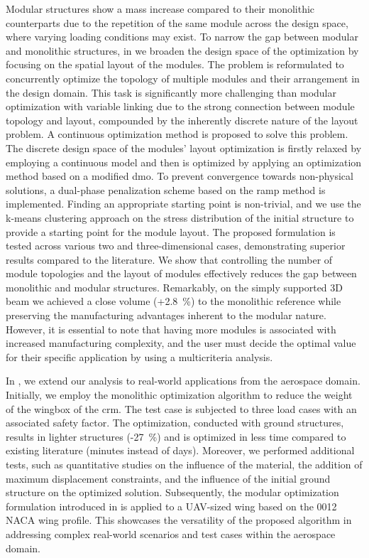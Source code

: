 Modular structures show a mass increase compared to their monolithic counterparts due to the repetition of the same module across the design space, where varying loading conditions may exist. To narrow the gap between modular and monolithic structures, in  we broaden the design space of the optimization by focusing on the spatial layout of the modules. The problem is reformulated to concurrently optimize the topology of multiple modules and their arrangement in the design domain. This task is significantly more challenging than modular optimization with variable linking due to the strong connection between module topology and layout, compounded by the inherently discrete nature of the layout problem. A continuous optimization method is proposed to solve this problem. The discrete design space of the modules' layout optimization is firstly relaxed by employing a continuous model and then is optimized by applying an optimization method based on a modified \gls{dmo}. To prevent convergence towards non-physical solutions, a dual-phase penalization scheme based on the \gls{ramp} method is implemented. Finding an appropriate starting point is non-trivial, and we use the k-means clustering approach on the stress distribution of the initial structure to provide a starting point for the module layout. The proposed formulation is tested across various two and three-dimensional cases, demonstrating superior results compared to the literature. We show that controlling the number of module topologies and the layout of modules effectively reduces the gap between monolithic and modular structures. Remarkably, on the simply supported 3D beam we achieved a close volume (+\qty{2.8}{\percent}) to the monolithic reference while preserving the manufacturing advantages inherent to the modular nature. However, it is essential to note that having more modules is associated with increased manufacturing complexity, and the user must decide the optimal value for their specific application by using a multicriteria analysis.

In , we extend our analysis to real-world applications from the aerospace domain. Initially, we employ the monolithic optimization algorithm to reduce the weight of the wingbox of the \gls{crm}. The test case is subjected to three load cases with an associated safety factor. The optimization, conducted with ground structures, results in lighter structures (-\qty{27}{\%}) and is optimized in less time compared to existing literature (minutes instead of days). Moreover, we performed additional tests, such as quantitative studies on the influence of the material, the addition of maximum displacement constraints, and the influence of the initial ground structure on the optimized solution. Subsequently, the modular optimization formulation introduced in  is applied to a UAV-sized wing based on the 0012 NACA wing profile. This showcases the versatility of the proposed algorithm in addressing complex real-world scenarios and test cases within the aerospace domain.

